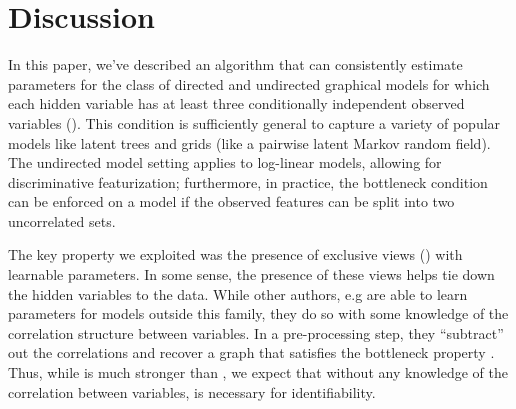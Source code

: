 \section{Discussion}
\label{sec:discussion}

In this paper, we've described an algorithm that can consistently
  estimate parameters for the class of directed and undirected graphical
  models for which each hidden variable has at least three conditionally
  independent observed variables ().
This condition is sufficiently general to capture a variety of popular
  models like latent trees and grids (like a pairwise latent Markov
  random field).
The undirected model setting applies to log-linear models, allowing
  for discriminative featurization; furthermore, in practice, the
  bottleneck condition can be enforced on a model if the observed
  features can be split into two uncorrelated sets.

The key property we exploited was the presence of exclusive views
  () with learnable parameters.
In some sense, the presence of these views helps tie down the hidden
  variables to the data. 
While other authors, e.g \citet{anandkumar12lda, anandkumar2013linear,
  halpern13noisyor} are able to learn parameters for models outside this
  family, they do so with some knowledge of the correlation structure
  between variables. 
In a pre-processing step, they ``subtract'' out the correlations and
  recover a graph that satisfies the bottleneck property
  .
Thus, while  is much stronger than
  , we expect that without any knowledge of
  the correlation between variables,  is
  necessary for identifiability.


